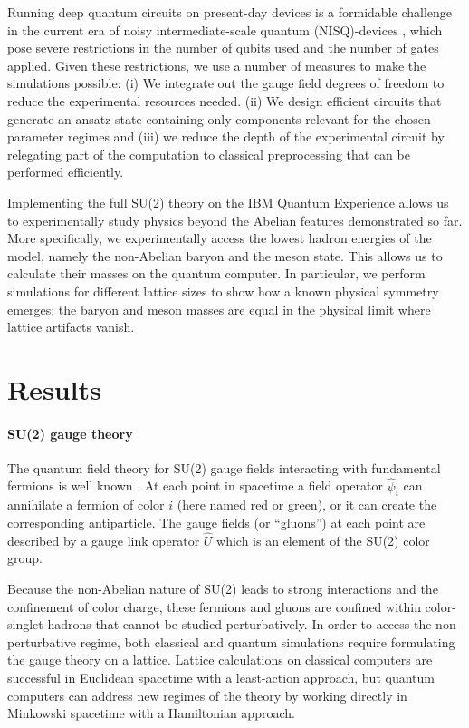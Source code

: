 \documentclass[twocolumn,aps,showpacs,prb,superscriptaddress,floatfix,10pt,nofootinbib]{revtex4-2}
\begin{document}
Running deep quantum circuits on present-day devices is a formidable challenge in the current era of noisy intermediate-scale quantum (NISQ)-devices \cite{preskill_quantum_2018}, which pose severe
restrictions in the number of qubits used and the number of gates applied. Given these restrictions, we use a number of measures to make the simulations possible: (i) We integrate out the gauge field degrees of freedom to reduce the experimental resources needed. (ii) We design efficient circuits that generate an ansatz state containing only components relevant for the chosen parameter regimes and (iii) we reduce the depth of the experimental circuit by relegating part of the computation to classical preprocessing that can be performed efficiently. 

Implementing the full SU(2) theory on the IBM Quantum Experience \cite{IBM_casablanca, IBM_athens} allows us to experimentally study physics beyond the Abelian features demonstrated so far. More specifically, we experimentally access the lowest hadron energies of the model, namely the non-Abelian baryon and the meson state. This allows us to calculate their masses on the quantum computer. In particular, we perform simulations for different lattice sizes to show how a known physical symmetry emerges: the baryon and meson masses are equal in the physical limit where lattice artifacts vanish. 

\section*{Results}

\paragraph{\textbf{SU(2) gauge theory}}
The quantum field theory for SU(2) gauge fields interacting with fundamental fermions is well known  \cite{taylor_gauge_1978}. At each point in spacetime a field operator $\hat{\psi}_i$ can annihilate a fermion of color $i$ (here named red or green), or it can create the corresponding antiparticle. The gauge fields (or ``gluons'') at each point are described by a gauge link operator $\hat{U}$ which is an element of the SU(2) color group.

Because the non-Abelian nature of SU(2) leads to strong interactions and the confinement of color charge, these fermions and gluons are confined within color-singlet hadrons that cannot be studied perturbatively. In order to access the non-perturbative regime, both classical and quantum simulations require formulating the gauge theory on a lattice. Lattice calculations on classical computers are successful in Euclidean spacetime with a least-action approach, but quantum computers can address new regimes of the theory by working directly in Minkowski spacetime with a Hamiltonian approach.
\end{document}
